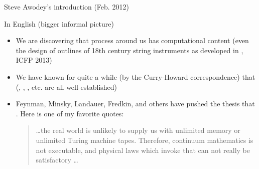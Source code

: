 \documentclass[11pt]{beamer}
\newcommand{\red}[1]{{\color{red}{#1}}}
\newcommand{\blue}[1]{{\color{blue}{#1}}}
\begin{document}
\begin{frame}{Steve Awodey's introduction (Feb. 2012)}

\begin{center}
\end{center}

\end{frame}

\begin{frame}{In English (bigger informal picture)}
\vfill
\begin{itemize}
\vfill\item We are discovering that \red{every} process around us has
computational content (even the design of outlines of 18th century string
instruments as developed in \blue{Functional geometry and the Trait\'e de
  Lutherie}, ICFP 2013)

\vfill\item We have known for quite a while (by the Curry-Howard
correspondence) that \red{mathematical proofs have computational content}
(\blue{type theory}, \blue{mechanized logic}, \blue{computational logic},
etc. are all well-established)

\vfill\item Feynman, Minsky, Landauer, Fredkin, and others have pushed the
thesis that \red{physical laws have computational content}. Here is one of my
favorite quotes:
\begin{quote}
  \ldots the real world is unlikely to supply us with unlimited memory or
  unlimited Turing machine tapes. Therefore, continuum mathematics is not
  executable, and physical laws which invoke that can not really be
  satisfactory \ldots
\end{quote}

\end{itemize}
\vfill
\end{frame}
\end{document}

